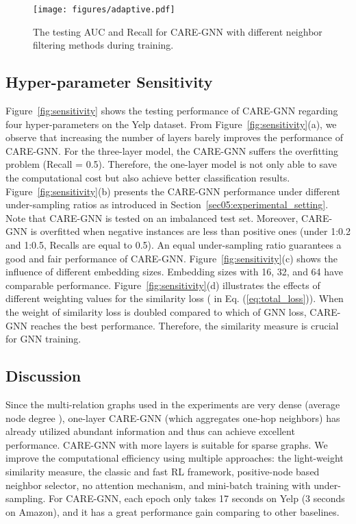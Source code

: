 \begin{figure}
     \centering
         \texttt{[image: figures/adaptive.pdf]}
         \caption{The testing AUC and Recall for CARE-GNN with different neighbor filtering methods during training.}
        \label{fig:adaptive}
\end{figure}



\subsection{Hyper-parameter Sensitivity}
\label{sec05:sensitivity}


Figure~\ref{fig:sensitivity} shows the testing performance of CARE-GNN regarding four hyper-parameters on the Yelp dataset.
From Figure~\ref{fig:sensitivity}(a), we observe that increasing the number of layers barely improves the performance of CARE-GNN.
For the three-layer model, the CARE-GNN suffers the overfitting problem (Recall = 0.5).
Therefore, the one-layer model is not only able to save the computational cost but also achieve better classification results.
Figure~\ref{fig:sensitivity}(b) presents the CARE-GNN performance under different under-sampling ratios as introduced in Section~\ref{sec05:experimental_setting}.
Note that CARE-GNN is tested on an imbalanced test set.
Moreover, CARE-GNN is overfitted when negative instances are less than positive ones (under 1:0.2 and 1:0.5, Recalls are equal to 0.5).
An equal under-sampling ratio guarantees a good and fair performance of CARE-GNN.
Figure~\ref{fig:sensitivity}(c) shows the influence of different embedding sizes. Embedding sizes with 16, 32, and 64 have comparable performance.
Figure~\ref{fig:sensitivity}(d) illustrates the effects of different weighting values for the similarity loss ( in Eq. (\ref{eq:total_loss})).
When the weight of similarity loss is doubled compared to which of GNN loss, CARE-GNN reaches the best performance.
Therefore, the similarity measure is crucial for GNN training.


\subsection{Discussion}
\label{sec05:discussion}

Since the multi-relation graphs used in the experiments are very dense (average node degree ), one-layer CARE-GNN (which aggregates one-hop neighbors) has already utilized abundant information and thus can achieve excellent performance.
CARE-GNN with more layers is suitable for sparse graphs.
We improve the computational efficiency using multiple approaches: the light-weight similarity measure, the classic and fast RL framework, positive-node based neighbor selector, no attention mechanism, and mini-batch training with under-sampling.
For CARE-GNN, each epoch only takes 17 seconds on Yelp (3 seconds on Amazon), and it has a great performance gain comparing to other baselines.

